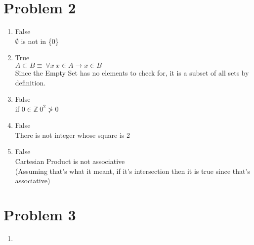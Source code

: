\documentclass{article}
\begin{document}
\section*{Problem 2}
\begin{enumerate}
    \item %
    False \\
    $\emptyset$ is not in \{0\}
    
    \item %
    True \\
    $A \subset B \equiv \ \forall x \ x \in A \to x \in B$ \\
    Since the Empty Set has no elements to check for, it is a subset of all sets by definition.
    
    \item %
    False \\
    if $0 \in \mathbb{Z} \ 0^2 \ngtr 0$ 
    
    \item %
    False \\
    There is not integer whose square is 2
    
    \item %
    False \\
    Cartesian Product is not associative \\
    (Assuming that's what it meant, if it's intersection then it is true since that's associative)


\end{enumerate}

\section*{Problem 3}
\begin{enumerate}
    \item %
    
\end{enumerate}
\end{document}
